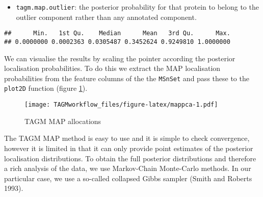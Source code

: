 \documentclass[]{article}
\newenvironment{Shaded}{\begin{snugshade}}{\end{snugshade}}
\newcommand{\KeywordTok}[1]{\textcolor[rgb]{0.13,0.29,0.53}{\textbf{{#1}}}}
\newcommand{\DataTypeTok}[1]{\textcolor[rgb]{0.13,0.29,0.53}{{#1}}}
\newcommand{\FloatTok}[1]{\textcolor[rgb]{0.00,0.00,0.81}{{#1}}}
\newcommand{\StringTok}[1]{\textcolor[rgb]{0.31,0.60,0.02}{{#1}}}
\newcommand{\CommentTok}[1]{\textcolor[rgb]{0.56,0.35,0.01}{\textit{{#1}}}}
\newcommand{\NormalTok}[1]{{#1}}
\providecommand{\tightlist}{%
  \setlength{\itemsep}{0pt}\setlength{\parskip}{0pt}}
\begin{document}
\begin{itemize}
\tightlist
\item
  \texttt{tagm.map.outlier}: the posterior probability for that protein
  to belong to the outlier component rather than any annotated
  component.
\end{itemize}

\begin{Shaded}
\end{Shaded}

\begin{verbatim}
##      Min.   1st Qu.    Median      Mean   3rd Qu.      Max. 
## 0.0000000 0.0002363 0.0305487 0.3452624 0.9249810 1.0000000
\end{verbatim}

We can visualise the results by scaling the pointer according the
posterior localisation probabilities. To do this we extract the MAP
localisation probabilities from the feature columns of the the
\texttt{MSnSet} and pass these to the \texttt{plot2D} function (figure
\ref{fig:mappca}).

\begin{Shaded}
\end{Shaded}

\begin{figure}[htbp]
\centering
\texttt{[image: TAGMworkflow\_files/figure-latex/mappca-1.pdf]}
\caption{\label{fig:mappca}TAGM MAP allocations}
\end{figure}

The TAGM MAP method is easy to use and it is simple to check
convergence, however it is limited in that it can only provide point
estimates of the posterior localisation distributions. To obtain the
full posterior distributions and therefore a rich analysis of the data,
we use Markov-Chain Monte-Carlo methods. In our particular case, we use
a so-called collapsed Gibbs sampler (Smith and Roberts 1993).
\end{document}
